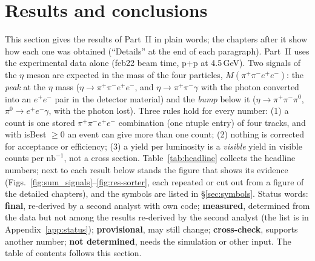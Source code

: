 \documentclass[11pt,a4paper]{article}
\newcommand{\pip}{\ensuremath{\pi^{+}}\xspace}
\newcommand{\pim}{\ensuremath{\pi^{-}}\xspace}
\newcommand{\piz}{\ensuremath{\pi^{0}}\xspace}
\newcommand{\ee}{\ensuremath{e^{+}e^{-}}\xspace}
\newcommand{\pipi}{\ensuremath{\pi^{+}\pi^{-}}\xspace}
\newcommand{\ppee}{\ensuremath{\pi^{+}\pi^{-}e^{+}e^{-}}\xspace}
\newcommand{\Mfour}{\ensuremath{M(\pi^{+}\pi^{-}e^{+}e^{-})}\xspace}
\newcommand{\nbinv}{\ensuremath{\mathrm{nb}^{-1}}\xspace}
\begin{document}
\section{Results and conclusions}
\label{sec:results}
This section gives the results of Part~II in plain words; the chapters after it show how each one was obtained (``Details'' at the
end of each paragraph). Part~II uses the experimental data alone (feb22 beam time, p+p at 4.5\,GeV). Two signals of the $\eta$ meson
are expected in the mass of the four particles, \Mfour: the \emph{peak} at the $\eta$ mass ($\eta\to\ppee$, and $\eta\to\pipi\gamma$
with the photon converted into an \ee pair in the detector material) and the \emph{bump} below it ($\eta\to\pipi\piz$,
$\piz\to\ee\gamma$, with the photon lost). Three rules hold for every number: (1) a count is one stored \pip\pim$e^+e^-$ combination (one ntuple entry) of
four tracks, and with isBest $\ge0$ an event can give more than one count; (2) nothing is corrected for acceptance or efficiency; (3) a yield per
luminosity is a \emph{visible} yield in visible counts per \nbinv, not a cross section. Table~\ref{tab:headline} collects the headline
numbers; next to each result below stands the figure that shows its evidence (Figs.~\ref{fig:sum_signals}--\ref{fig:res-sorter}, each
repeated or cut out from a figure of the detailed chapters), and the symbols are listed in \S\ref{sec:symbols}. Status words:
\textbf{final}, re-derived by a second analyst with own code; \textbf{measured}, determined from the data but not among the results
re-derived by the second analyst (the list is in Appendix~\ref{app:status}); \textbf{provisional}, may still change; \textbf{cross-check},
supports another number; \textbf{not determined}, needs the simulation or other input. The table of contents follows this section.
\end{document}
